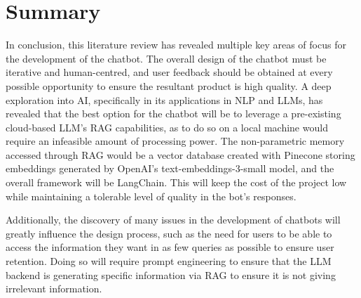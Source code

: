 \documentclass[12pt]{report}
\begin{document}

    \pagebreak 

    \section{Summary}
    
    In conclusion, this literature review has revealed multiple key areas of focus for the development of the 
    chatbot. The overall design of the chatbot must be iterative and human-centred, and user feedback should 
    be obtained at every possible opportunity to ensure the resultant product is high quality. A deep exploration 
    into AI, specifically in its applications in NLP and LLMs, has revealed that the best option for the chatbot 
    will be to leverage a pre-existing cloud-based LLM's RAG capabilities, as to do so on a local machine would require an infeasible amount of processing power.
    The non-parametric memory accessed through RAG would be a vector database created with Pinecone storing embeddings generated by OpenAI's text-embeddings-3-small 
    model, and the overall framework will be LangChain. This will keep the cost of the project low while maintaining a tolerable level of quality in the bot's responses.

    Additionally, the discovery of many issues in the development of chatbots will greatly influence the design 
    process, such as the need for users to be able to access the information they want in as few queries as 
    possible to ensure user retention. Doing so will require prompt engineering to ensure that the LLM backend 
    is generating specific information via RAG to ensure it is not giving irrelevant information.
\end{document}
